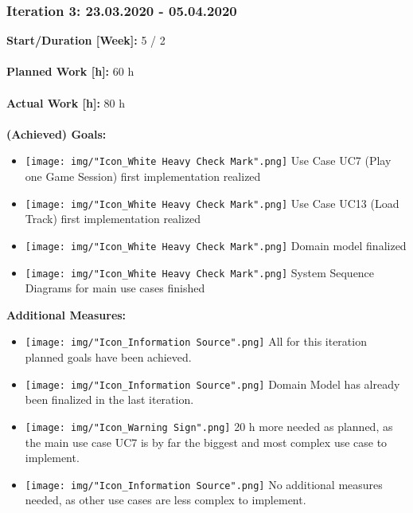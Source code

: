 			\subsubsection{Iteration 3: 23.03.2020 - 05.04.2020}
				\textbf{Start/Duration [Week]:} 5 / 2 \\~\\
				\textbf{Planned Work [h]:} 60 h \\~\\
				\textbf{Actual Work [h]:} 80 h \\~\\
				\textbf{(Achieved) Goals:}
				\begin{itemize}
					\item \texttt{[image: img/"Icon\_White Heavy Check Mark".png]} Use Case UC7 (Play one Game Session) first implementation realized
					\item \texttt{[image: img/"Icon\_White Heavy Check Mark".png]} Use Case UC13 (Load Track) first implementation realized
					\item \texttt{[image: img/"Icon\_White Heavy Check Mark".png]} Domain model finalized
					\item \texttt{[image: img/"Icon\_White Heavy Check Mark".png]} System Sequence Diagrams for main use cases finished
				\end{itemize}
				\textbf{Additional Measures:}
				\begin{itemize}
					\item \texttt{[image: img/"Icon\_Information Source".png]} All for this iteration planned goals have been achieved.
					\item \texttt{[image: img/"Icon\_Information Source".png]} Domain Model has already been finalized in the last iteration.
					\item \texttt{[image: img/"Icon\_Warning Sign".png]} 20 h more needed as planned, as the main use case UC7 is by far the biggest and most complex use case to implement.
					\item \texttt{[image: img/"Icon\_Information Source".png]} No additional measures needed, as other use cases are less complex to implement.
				\end{itemize}

